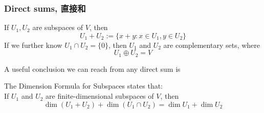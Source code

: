 \subsubsection{Direct sums, 直接和}
\begin{definition}
    If $U_1, U_2$ are subspaces of $V$, then
    $$U_1 + U_2 := \{x+y: x \in U_1, y \in U_2\}$$
    If we further know $U_1 \cap U_2 = \{0\}$, then $U_1$ and $U_2$ are complementary sets, where
    $$U_1 \oplus U_2 = V$$
\end{definition}
A useful conclusion we can reach from any direct sum is
\begin{theorem}
    The Dimension Formula for Subspaces states that: \\
    If $U_1$ and $U_2$ are finite-dimensional subspaces of $V$, then
    $$\dim (U_1 + U_2) + \dim (U_1 \cap U_2) = \dim U_1 + \dim U_2$$
\end{theorem}
\newpage
